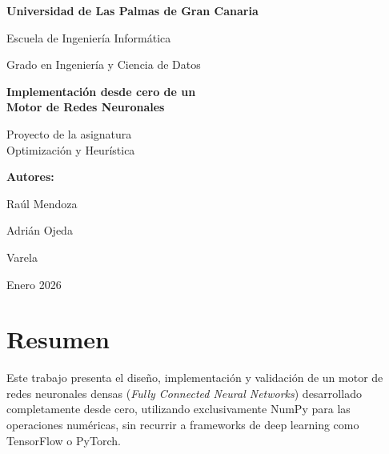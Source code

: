 \documentclass[a4paper,11pt]{article}
\begin{document}
\begin{titlepage}
    \centering
    \vspace*{2cm}
    
    {\LARGE\bfseries Universidad de Las Palmas de Gran Canaria\par}
    \vspace{0.5cm}
    {\Large Escuela de Ingeniería Informática\par}
    {\Large Grado en Ingeniería y Ciencia de Datos\par}
    
    \vspace{2cm}
    
    {\Huge\bfseries Implementación desde cero de un\\Motor de Redes Neuronales\par}
    
    \vspace{1cm}
    
    {\Large Proyecto de la asignatura\\Optimización y Heurística\par}
    
    \vspace{2cm}
    
    {\Large\bfseries Autores:\par}
    \vspace{0.3cm}
    {\large Raúl Mendoza\par}
    {\large Adrián Ojeda\par}
    {\large Varela\par}
    
    \vfill
    
    {\large Enero 2026\par}
\end{titlepage}

\newpage
\section*{Resumen}

Este trabajo presenta el diseño, implementación y validación de un motor de redes neuronales densas (\textit{Fully Connected Neural Networks}) desarrollado completamente desde cero, utilizando exclusivamente NumPy para las operaciones numéricas, sin recurrir a frameworks de deep learning como TensorFlow o PyTorch.
\end{document}
